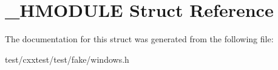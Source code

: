 \hypertarget{struct__HMODULE}{\section{\-\_\-\-H\-M\-O\-D\-U\-L\-E Struct Reference}
\label{struct__HMODULE}
}


The documentation for this struct was generated from the following file\-:\begin{DoxyCompactItemize}
\item 
test/cxxtest/test/fake/windows.\-h\end{DoxyCompactItemize}
